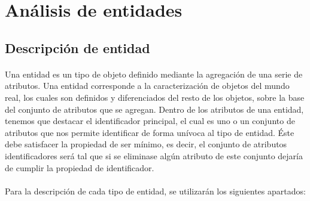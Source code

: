 \section{Análisis de entidades}

   \subsection{Descripción de entidad}

   \paragraph{}Una entidad es un tipo de objeto definido mediante la agregación
   de una serie de atributos. Una entidad corresponde a la caracterización de
   objetos del mundo real, los cuales son definidos y diferenciados del resto de
   los objetos, sobre la base del conjunto de atributos que se agregan. Dentro
   de los atributos de una entidad, tenemos que destacar el identificador
   principal, el cual es uno o un conjunto de atributos que nos permite
   identificar de forma unívoca al tipo de entidad. Éste debe satisfacer la
   propiedad de ser mínimo, es decir, el conjunto de atributos identificadores
   será tal que si se eliminase algún atributo de este conjunto dejaría de
   cumplir la propiedad de identificador.

   \paragraph{}Para la descripción de cada tipo de entidad, se utilizarán los
   siguientes apartados:

